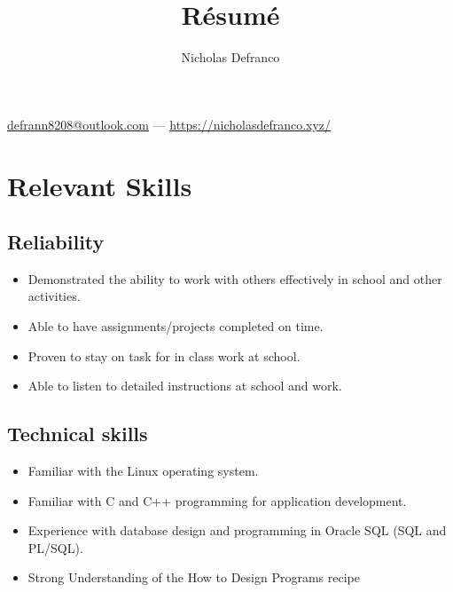 \documentclass{article}
\makeatletter
\renewcommand{\maketitle}{
\begin{center}
{\Large\bfseries
\theauthor}

\vspace{0.75em}

\href{mailto://defrann8208@outlook.com}{defrann8208@outlook.com} ---
\url{https://nicholasdefranco.xyz/}

\vspace{0.25em}

\end{center}
}
\makeatother
\begin{document}
\title{R\'esum\'e}
\author{Nicholas Defranco}

\maketitle


\section{Relevant Skills}

\subsection{Reliability}

\begin{itemize}

\item Demonstrated the ability to work with others effectively in school and
	other activities.

\item Able to have assignments/projects completed on time.

\item Proven to stay on task for in class work at school.

\item Able to listen to detailed instructions at school and work.

\end{itemize}

\subsection{Technical skills}

\begin{itemize}

\item Familiar with the Linux operating system.

\item Familiar with C and C++ programming for application development.

\item Experience with database design and programming in Oracle SQL (SQL and
	PL/SQL).

\item Strong Understanding of the How to Design Programs recipe

\end{itemize}
\end{document}
